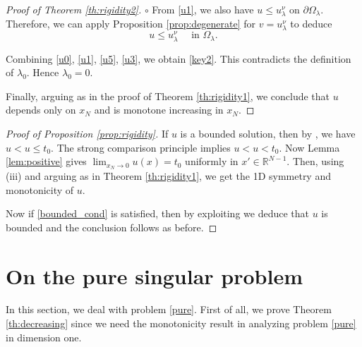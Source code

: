 \documentclass[reqno]{amsart}
\theoremstyle{plain}
\theoremstyle{definition}
\theoremstyle{remark}
\begin{document}
\begin{proof}[Proof of Theorem \ref{th:rigidity2}]
		$\circ$ From \eqref{u1}, we also have $u \le u_\lambda^\nu$ on $\partial \Omega_\lambda$. Therefore, we can apply Proposition \ref{prop:degenerate} for $v=u_\lambda^\nu$ to deduce
		\begin{equation}\label{u3}
			u \le u_\lambda^\nu \quad\text{ in } \Omega_\lambda.
		\end{equation}
		
		Combining \eqref{u0}, \eqref{u1}, \eqref{u5}, \eqref{u3}, we obtain \eqref{key2}. This contradicts the definition of $\lambda_0$. Hence $\lambda_0=0$.
		
		Finally, arguing as in the proof of Theorem \ref{th:rigidity1}, we conclude that $u$ depends only on $x_N$ and is monotone increasing in $x_N$.
	\end{proof}
	
	\begin{proof}[Proof of Proposition \ref{prop:rigidity}]
		If $u$ is a bounded solution, then by \cite[Proposition 2.2]{MR2056284}, we have $u<u\le t_0$. The strong comparison principle implies $u<u<t_0$. Now Lemma \ref{lem:positive} gives $\lim_{x_N\to0} u(x)= t_0$ uniformly in $x'\in\mathbb{R}^{N-1}$. Then, using (iii) and arguing as in Theorem \ref{th:rigidity1}, we get the 1D symmetry and monotonicity of $u$.
		
		Now if \eqref{bounded_cond} is satisfied, then by exploiting \cite[Proposition 2.3]{MR2056284} we deduce that $u$ is bounded and the conclusion follows as before.
	\end{proof}
	
	\section{On the pure singular problem}\label{sect5}
	In this section, we deal with problem \eqref{pure}. First of all, we prove Theorem \ref{th:decreasing} since we need the monotonicity result in analyzing problem \eqref{pure} in dimension one.
	
\end{document}
